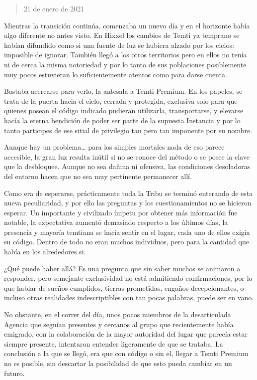 \documentclass[
]{book}
\begin{document}
\begin{quote}
21 de enero de 2021
\end{quote}

Mientras la transición continúa, comenzaba un nuevo día y en el horizonte había algo diferente no antes visto. En Hixxel los cambios de Temti ya temprano se habían difundido como si una fuente de luz se hubiera alzado por los cielos: imposible de ignorar. También llegó a los otros territorios pero en ellos no tenía ni de cerca la misma notoriedad y por lo tanto de sus poblaciones posiblemente muy pocos estuvieran lo suficientemente atentos como para darse cuenta.

Bastaba acercarse para verlo, la antesala a Temti Premium. En los papeles, se trata de la puerta hacia el cielo, cerrada y protegida, exclusiva solo para que quienes posean el código indicado pudieran utilizarla, transportarse, y elevarse hacía la eterna bendición de poder ser parte de la supuesta Instancia y por lo tanto participes de ese sitial de privilegio tan pero tan imponente por su nombre.

Aunque hay un problema\ldots{} para los simples mortales nada de eso parece accesible, la gran luz resulta inútil si no se conoce del método o se posee la clave que la desbloquee. Aunque no sea dañina ni ofensiva, las condiciones desoladoras del entorno hacen que no sea muy pertinente permanecer allí.

Como era de esperarse, prácticamente toda la Tribu se terminó enterando de esta nueva peculiaridad, y por ello las preguntas y los cuestionamientos no se hicieron esperar. Un importante y civilizado ímpetu por obtener más información fue notable, la expectativa aumentó demasiado respecto a los últimos días, la presencia y mayoría temtiana se hacía sentir en el lugar, cada uno de ellos exigía su código. Dentro de todo no eran muchos individuos, pero para la cantidad que había en los alrededores si.

¿Qué puede haber allá? Es una pregunta que sin saber muchos se animaron a responder, pero semejante exclusividad no está admitiendo confirmaciones, por lo que hablar de sueños cumplidos, tierras prometidas, engaños decepcionantes, o incluso otras realidades indescriptibles con tan pocas palabras, puede ser en vano.

No obstante, en el correr del día, unos pocos miembros de la desarticulada Agencia que seguían presentes y cercanos al grupo que recientemente había emigrado, con la colaboración de la mayor autoridad del lugar que parecía estar siempre presente, intentaron entender ligeramente de que se trataba. La conclusión a la que se llegó, era que con código o sin el, llegar a Temti Premium no es posible, sin descartar la posibilidad de que esto pueda cambiar en un futuro.
\end{document}
